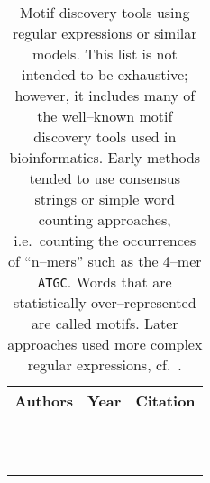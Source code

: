 \begin{table}[ptbh]
    \caption[Motif discovery tools using regular expressions or similar models]{
        Motif discovery tools using regular expressions or similar
        models.  This list is not intended to be exhaustive;
        however, it includes many of the well--known motif discovery
        tools used in bioinformatics.  Early methods tended to use
        consensus strings or simple word counting approaches, i.e.\
        counting the occurrences of ``n--mers'' such as the 4--mer
        \texttt{ATGC}.  Words that are statistically over--represented
        are called motifs.  Later approaches used more complex
        regular expressions, cf.~\citet{rigoutsos1998combinatorial}.
        }
            \label{table:regexMD}
                    \centering
            \begin{tabular}{lcc} \hline\hline
Authors & Year & Citation \\ \hline
\citeauthor{queen1982improvements} & \citeyear{queen1982improvements} & \cite{queen1982improvements} \\
\citeauthor{galas1985rigorous} & \citeyear{galas1985rigorous} & \cite{galas1985rigorous} \\
\citeauthor{mengeritsky1987recognition} & \citeyear{mengeritsky1987recognition} & \cite{mengeritsky1987recognition} \\
\citeauthor{staden1989methods} & \citeyear{staden1989methods} & \cite{staden1989methods} \\
\citeauthor{neuwald1994detecting} & \citeyear{neuwald1994detecting} & \cite{neuwald1994detecting} \\
\citeauthor{jonassen1995finding} & \citeyear{jonassen1995finding} & \cite{jonassen1995finding} \\
\citeauthor{wolferstetter1996identification} & \citeyear{wolferstetter1996identification} & \cite{wolferstetter1996identification} \\
\citeauthor{sagot1997multiple} & \citeyear{sagot1997multiple} & \cite{sagot1997multiple} \\
\citeauthor{rigoutsos1998combinatorial} & \citeyear{rigoutsos1998combinatorial} & \cite{rigoutsos1998combinatorial,floratos1999pattern} \\
\citeauthor{van1998extracting} & \citeyear{van1998extracting} & \cite{van1998extracting,van2000discovering} \\
\citeauthor{jacobs2000computational} & \citeyear{jacobs2000computational} & \cite{jacobs2000computational} \\

\end{tabular}
\end{table}
